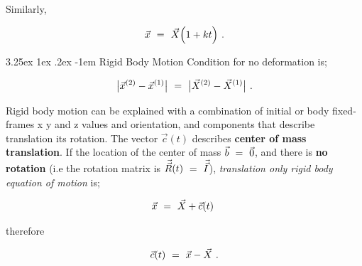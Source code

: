 \documentclass{article}
\makeatletter
\renewcommand\subparagraph{\@startsection{subparagraph}{6}{\parindent}%
  {3.25ex \@plus1ex \@minus .2ex}%
  {-1em}%
  {\normalfont\normalsize\bfseries}}
\makeatother
\begin{document}
Similarly,

\begin{equation} \label{eb-eq-1-30}
\vec{x} \hspace{0.125cm} = \hspace{0.125cm} \vec{X} \Big( 1 + k t \Big)  \hspace{0.125cm} .
\end{equation}

\subparagraph{Rigid Body Motion}
Condition for no deformation is;

\begin{equation} \label{eb-eq-1-31}
\big| \vec{x}^{(2)} - \vec{x}^{(1)} \big| \hspace{0.125cm} = \hspace{0.125cm} \big| \vec{X}^{(2)} - \vec{X}^{(1)} \big|  \hspace{0.125cm} .
\end{equation}

Rigid body motion can be explained with a combination of initial or body fixed-frames x y and z values and orientation, and components that describe translation its rotation. The vector \begin{math} \vec{c}(t) \end{math} describes \textbf{center of mass translation}. If the location of the center of mass \begin{math} \vec{b} \hspace{0.125cm} = \hspace{0.125cm} \vec{0} \end{math}, and there is \textbf{no rotation} (i.e the rotation matrix is \begin{math} \vec{\vec{R}}(t) \hspace{0.125cm} = \hspace{0.125cm} \vec{\vec{I}} \end{math}), \textit{translation only rigid body equation of motion} is;

\begin{equation} \label{eb-eq-1-32}
\vec{x} \hspace{0.125cm} = \hspace{0.125cm} \vec{X} + \vec{c}(t)   \hspace{0.125cm} 
\end{equation}

therefore 

\begin{equation} \label{eb-eq-1-33}
\vec{c}(t) \hspace{0.125cm} = \hspace{0.125cm} \vec{x} - \vec{X} \hspace{0.125cm} .
\end{equation}
\end{document}
